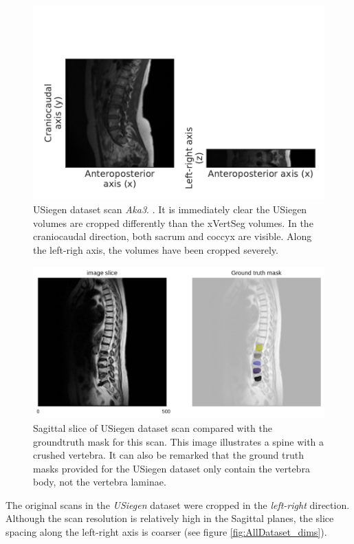 \begin{figure}
    \centering
    \includegraphics[width=.95\textwidth]{automated_graphs/USiegen_Aka3.pdf}
    \caption{USiegen dataset scan \textit{Aka3}. \label{fig:USiegen_Aka3}. It is immediately clear the USiegen volumes are cropped differently than the xVertSeg volumes.
    In the craniocaudal direction, both sacrum and coccyx are visible. Along the left-righ axis, the volumes have been cropped severely.}
\end{figure}
\begin{figure}
    \centering
    \includegraphics[width=.95\textwidth]{images/USiegen004_s20_mask.pdf}
    \caption{\label{fig:USiegen004_s20_mask}Sagittal slice of USiegen dataset scan compared with the \Gls{groundtruth} mask for this scan.
    This image illustrates a spine with a crushed vertebra. 
    It can also be remarked that the ground truth masks provided for the USiegen dataset only contain the vertebra body, not the vertebra laminae.
    \protect
    }
\end{figure}

The original scans in the \textit{USiegen} dataset were cropped in the \textit{left-right} direction. 
Although the scan resolution is relatively high in the Sagittal planes, the slice spacing along the left-right axis is coarser (see figure \ref{fig:AllDataset_dims}).  